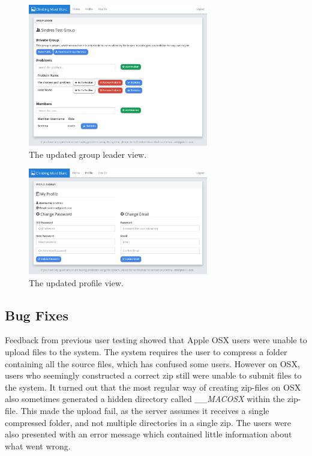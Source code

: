 \begin{figure}[h!]
    \centering
    \includegraphics[width=0.7\textwidth]{figs/new_leader.jpg}
    \caption[The updated group leader view]{The updated group leader view.}
    \label{fig:new-leader}
\end{figure}

\begin{figure}[h!]
    \centering
    \includegraphics[width=0.7\textwidth]{figs/new_profile.jpg}
    \caption[The updated profile view]{The updated profile view.}
    \label{fig:new-profile}
\end{figure}

\subsection{Bug Fixes}
Feedback from previous user testing showed that Apple OSX users were unable to upload files to the system. The system requires the user to compress a folder containing all the source files, which has confused some users. However on OSX, users who seemingly constructed a correct zip still were unable to submit files to the system. It turned out that the most regular way of creating zip-files on OSX also sometimes generated a hidden directory called \textit{\_\_MACOSX} within the zip-file. This made the upload fail, as the server assumes it receives a single compressed folder, and not multiple directories in a single zip. The users were also presented with an error message which contained little information about what went wrong. \\


